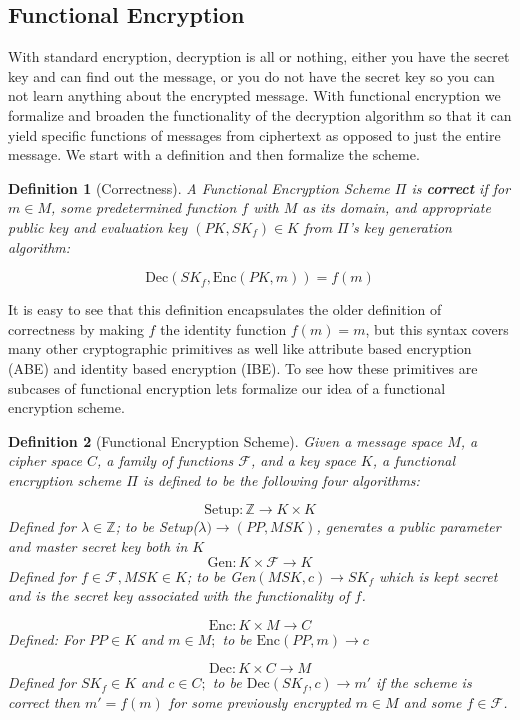 \documentclass[12pt,twoside]{reedthesis}
\newtheorem{definition}{Definition}
\newcommand{\enc}[0]{\text{Enc}}
\newcommand{\dec}[0]{\text{Dec}}
\newcommand{\Z}[0]{\mathbb{Z}}
\begin{document}
\subsection{Functional Encryption}

With standard encryption, decryption is all or nothing, either you have the secret key and can find out the message, or you do not have the secret key so you can not learn anything about the encrypted message. With functional encryption we formalize and broaden the functionality of the decryption algorithm so that it can yield specific functions of messages from ciphertext as opposed to just the entire message. We start with a definition and then formalize the scheme.
\begin{definition}[Correctness]
A Functional Encryption Scheme $\Pi$ is \textbf{correct} if for $m \in M$, some predetermined function $f$ with $M$ as its domain, and appropriate public key and \textit{evaluation} key $(PK,SK_f)\in K$ from $\Pi$'s key generation algorithm:

$$\dec(SK_f, \enc(PK,m)) = f(m) $$
\end{definition}

It is easy to see that this definition encapsulates the older definition of correctness by making $f$ the identity function $f(m) = m$, but this syntax covers many other cryptographic primitives as well like attribute based encryption (ABE) and identity based encryption (IBE). To see how these primitives are subcases of functional encryption lets formalize our idea of a functional encryption scheme. 




\begin{definition}[Functional Encryption Scheme]
Given a message space $M$, a cipher space $C$, a family of functions $\mathcal{F}$, and a key space $K$, a functional encryption scheme $\Pi$ is defined to be the following four algorithms:

$$\text{Setup}: \Z \rightarrow K \times K$$
Defined for $\lambda \in \Z$; to be Setup($\lambda) \rightarrow (PP,MSK)$, generates a public parameter and master secret key both in $K$
$$\text{Gen}: K \times \mathcal{F} \rightarrow K $$
Defined for $f \in \mathcal{F}, MSK \in K$; to be Gen$(MSK,c) \rightarrow SK_f$ which is kept secret and is the secret key associated with the functionality of $f$.

$$\enc: K \times M \rightarrow C$$
Defined: For $PP\in K$ and $m \in M;$ to be $\enc(PP,m) \rightarrow c$

$$\dec:K \times C \rightarrow M$$
Defined for $SK_f \in K$ and $c \in C;$ to be $\dec(SK_f,c) \rightarrow m'$ if the scheme is correct then $m' = f(m)$ for some previously encrypted $m\in M$ and some $f\in \mathcal{F}$.

\end{definition}
\end{document}
